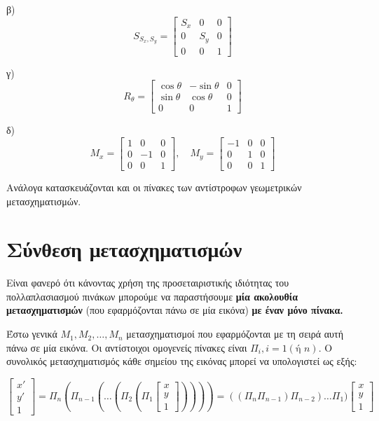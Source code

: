  β)  
\[
S_{S_x,S_y} = \begin{bmatrix} S_x & 0 & 0 \\ 0 & S_y & 0 \\ 0 & 0 & 1 \end{bmatrix}
\]

 γ)
\[
R_{\theta} = \begin{bmatrix} \cos\theta & -\sin\theta & 0 \\ \sin\theta & \cos\theta & 0 \\ 0 & 0 & 1 \end{bmatrix}
\]

 δ) 
\[
M_x = \begin{bmatrix} 1 & 0 & 0 \\ 0 & -1 & 0 \\ 0 & 0 & 1 \end{bmatrix}, \quad M_y = \begin{bmatrix} -1 & 0 & 0 \\ 0 & 1 & 0 \\ 0 & 0 & 1 \end{bmatrix}
\]

 Ανάλογα κατασκευάζονται και οι πίνακες των αντίστροφων γεωμετρικών μετασχηματισμών.



\section{Σύνθεση μετασχηματισμών}

Είναι φανερό ότι κάνοντας χρήση της προσεταιριστικής ιδιότητας του πολλαπλασιασμού πινάκων μπορούμε να παραστήσουμε \textbf{μία ακολουθία μετασχηματισμών} (που εφαρμόζονται πάνω σε μία εικόνα) \textbf{με έναν μόνο πίνακα.}

Έστω γενικά $M_1, M_2, \ldots, M_n$ μετασχηματισμοί που εφαρμόζονται με τη σειρά αυτή πάνω σε μία εικόνα. Οι αντίστοιχοι ομογενείς πίνακες είναι $\Pi_i, i=1(\text{ή } n)$. Ο συνολικός μετασχηματισμός κάθε σημείου της εικόνας μπορεί να υπολογιστεί ως εξής:

\[
\begin{bmatrix}
x' \\ y' \\ 1
\end{bmatrix}
=
\Pi_n (\Pi_{n-1} (\ldots (\Pi_2 (\Pi_1
\begin{bmatrix}
x \\ y \\ 1
\end{bmatrix}))))
=
((\Pi_n \Pi_{n-1}) \Pi_{n-2}) \ldots \Pi_1)
\begin{bmatrix}
x \\ y \\ 1
\end{bmatrix}
\]

